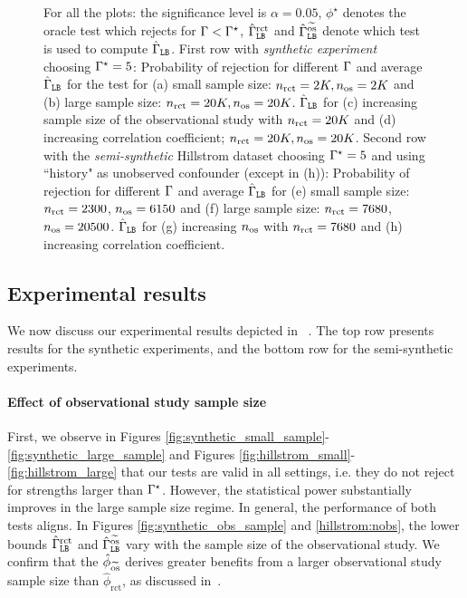 \begin{figure}
\begin{subfigure}[b]{0.245\textwidth}
    \end{subfigure}
    
    \caption{\small{For all the plots: the significance level is $\alpha=0.05$, $\phi^\star$ denotes the oracle test which rejects for $\Gamma<
    \Gamma^{\star}$, $\hat{\Gamma}_{\texttt{LB}}^{\mathrm{rct}}$ and $\hat{\Gamma}_{\texttt{LB}}^{\widetilde{\mathrm{os}}}$ denote which test is used to compute $\hat{\Gamma}_{\texttt{LB}}$. First row with \emph{synthetic experiment} choosing  $\Gamma^{\star}=5$: Probability of rejection for different $\Gamma$ and average $\hat{\Gamma}_{\texttt{LB}}$ for the test for (a) small sample size: $n_{\operatorname{rct}}=2K,n_{\operatorname{os}}=2K$ and (b) large sample size: $n_{\operatorname{rct}}=20K,n_{\operatorname{os}}=20K$. $\hat{\Gamma}_{\texttt{LB}}$ for (c) increasing sample size of the observational study with $n_{\operatorname{rct}}=20K$ and (d) increasing correlation coefficient; $n_{\operatorname{rct}}=20K,n_{\operatorname{os}}=20K$. Second row with the \emph{semi-synthetic} Hillstrom dataset choosing $\Gamma^{\star}=5$ and using ``history" as unobserved confounder (except in (h)): Probability of rejection for different $\Gamma$ and average $\hat{\Gamma}_{\texttt{LB}}$ for (e) small sample size: $n_{\operatorname{rct}}=2300$, $n_{\operatorname{os}}=6150$ and (f) large sample size: $n_{\operatorname{rct}}=7680$, $n_{\operatorname{os}}=20500$. $\hat{\Gamma}_{\texttt{LB}}$ for (g) increasing $n_{\operatorname{os}}$ with $n_{\operatorname{rct}}=7680$ and (h) increasing correlation coefficient.}
 }
    \label{fig:ate_synthetic}
\end{figure}


\subsection{Experimental results}
 \label{sec:results}
 We now discuss our experimental results depicted in
~. The top row presents results for the synthetic experiments, and the bottom row for the semi-synthetic experiments. 



\paragraph{Effect of observational study sample size} 

First, we observe in Figures \ref{fig:synthetic_small_sample}-\ref{fig:synthetic_large_sample} and Figures \ref{fig:hillstrom_small}-\ref{fig:hillstrom_large} that our tests are valid in all settings, i.e. they do not reject for strengths larger than $\Gamma^{\star}$. 
However, the statistical power substantially improves in the large sample size regime.  
 In general, the performance of both tests aligns.
In Figures \ref{fig:synthetic_obs_sample} and \ref{hillstrom:nobs}, the lower bounds $\hat{\Gamma}_{\texttt{LB}}^{\mathrm{rct}}$ and $\hat{\Gamma}_{\texttt{LB}}^{\widetilde{\mathrm{os}}}$ vary
with the sample size of the observational study. We confirm that the $\hat{\phi}_{\widetilde{\mathrm{os}}}$  derives greater benefits from a larger observational study sample size than $\hat{\phi}_{\mathrm{rct}}$, as discussed in~. 


